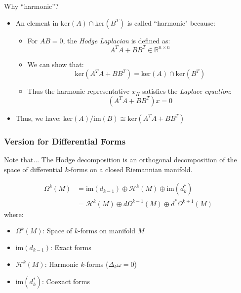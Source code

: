 \documentclass[aspectratio=169,xcolor=dvipsnames]{beamer}
\begin{document}
\begin{frame}{Why ``harmonic''?}
    \begin{itemize}
        \item An element in $\text{ker}(A) \cap \text{ker}(B^T)$ is called ``harmonic" because:
        \begin{itemize}
            \item For $AB = 0$, the \textit{Hodge Laplacian} is defined as:
            \begin{equation*}
                A^TA + BB^T \in \mathbb{R}^{n \times n}
            \end{equation*}
            
            \item We can show that:
            \begin{equation*}
                \text{ker}(A^TA + BB^T) = \text{ker}(A) \cap \text{ker}(B^T)
            \end{equation*}
            
            \item Thus the harmonic representative $x_H$ satisfies the \textit{Laplace equation}:
            \begin{equation*}
                (A^TA + BB^T)x = 0
            \end{equation*}
        \end{itemize}
        
        \item Thus, we have: $\text{ker}(A)/\text{im}(B) \cong \text{ker}(A^TA + BB^T)$
    \end{itemize}
\end{frame}

\begin{frame}
\frametitle{Version for Differential Forms}

\begin{block}{Note that...}
The Hodge decomposition is an orthogonal decomposition of the space of differential $k$-forms on a closed Riemannian manifold.
\end{block}

\begin{align*}
\Omega^k(M) &=\text{im}(d_{k-1}) \oplus \mathcal{H}^k(M) \oplus \text{im}(d_k^*)\\
&= \mathcal{H}^k(M)\oplus d\Omega^{k-1}(M) \oplus d^*\Omega^{k+1}(M)
\end{align*}
where:
\begin{itemize}
\item $\Omega^k(M)$: Space of $k$-forms on manifold $M$
\item $\text{im}(d_{k-1})$: Exact forms
\item $\mathcal{H}^k(M)$: Harmonic $k$-forms ($\Delta_k \omega = 0$)
\item $\text{im}(d_k^*)$: Coexact forms
\end{itemize}

\end{frame}
\end{document}
